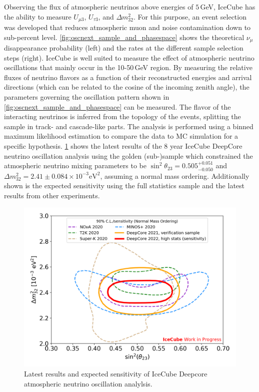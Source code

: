 \documentclass[a4paper,11pt]{article}
\begin{document}
Observing the flux of atmospheric neutrinos above energies of $5\,$GeV, IceCube has the ability to measure $U_{\mu3}$, $U_{\tau3}$, and $\Delta m^{2}_{32}$. For this purpose, an event selection was developed that reduces atmospheric muon and noise contamination down to sub-percent level. \cref{fig:oscnext_sample_and_phasespace} shows the theoretical $\nu_{\mu}$ disappearance probability (left) and the rates at the different sample selection steps (right). IceCube is well suited to measure the effect of atmospheric neutrino oscillations that mainly occur in the 10-50\,GeV region. By measuring the relative fluxes of neutrino flavors as a function of their reconstructed energies and arrival directions (which can be related to the cosine of the incoming zenith angle), the parameters governing the oscillation pattern shown in \cref{fig:oscnext_sample_and_phasespace} can be measured. The flavor of the interacting neutrinos is inferred from the topology of the events, splitting the sample in track- and cascade-like parts. The analysis is performed using a binned maximum likelihood estimation to compare the data to MC simulation for a specific hypothesis. \cref{fig:oscnext_oscillations_results} shows the latest results of the 8 year IceCube DeepCore neutrino oscillation analysis using the golden (sub-)sample which constrained the atmospheric neutrino mixing parameters to be $\sin^2\theta_{23} = 0.505^{+0.051}_{-0.050}$ and $\Delta m^2_{32} = 2.41\pm0.084 \times 10^{-3}\mathrm{eV}^2$, assuming a normal mass ordering. Additionally shown is the expected sensitivity using the full statistics sample and the latest results from other experiments.

\begin{figure}[h!]
  \centering
  \includegraphics[height=0.4\linewidth]{figures/OscNext_numu_disappearance_sensitivity_public_v2.png}
  \caption{Latest results and expected sensitivity of IceCube Deepcore atmospheric neutrino oscillation analylsis.}
  \label{fig:oscnext_oscillations_results}
\end{figure}
\end{document}
